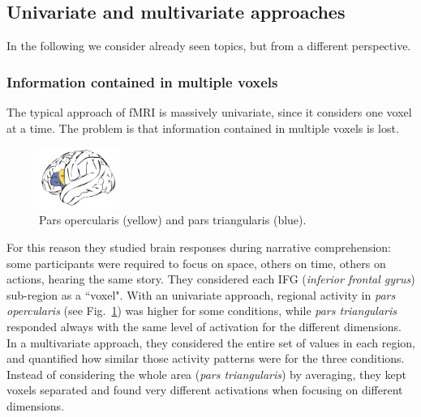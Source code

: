 \subsection{Univariate and multivariate approaches}
In the following we consider already seen topics, but from a different perspective.

\subsubsection{Information contained in multiple voxels}
The typical approach of fMRI is massively univariate, since it considers one voxel at a time. The problem is that information contained in multiple voxels is lost.

\begin{figure}
  \centering
  \includegraphics[width=0.23\textwidth]{images/ptri.png}
  \caption{Pars opercularis (yellow) and pars triangularis (blue).}
  \label{fig:ptri}
\end{figure}

For this reason they studied brain responses during narrative comprehension: some participants were required to focus on space, others on time, others on actions, hearing the same story.
They considered each IFG (\textit{inferior frontal gyrus}) sub-region as a ``voxel".
With an univariate approach, regional activity in \textit{pars opercularis} (see Fig.~\ref{fig:ptri}) was higher for some conditions, while \textit{pars triangularis} responded always with the same level of activation for the different dimensions.
In a multivariate approach, they considered the entire set of values in each region, and quantified how similar those activity patterns were for the three conditions. Instead of considering the whole area (\textit{pars triangularis}) by averaging, they kept voxels separated and found very different activations when focusing on different dimensions.

